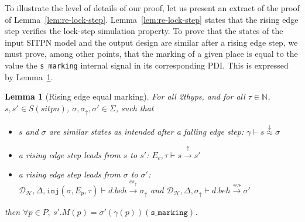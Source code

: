 \documentclass[pdflatex,sn-mathphys]{sn-jnl}%
\theoremstyle{thmstyleone}%
\theoremstyle{thmstyletwo}%
\theoremstyle{thmstylethree}%
\newtheorem{lemma}{Lemma}%
\begin{document}
To illustrate the level of details of our proof, let us present an
extract of the proof of
Lemma~\ref{lem:re-lock-step}. Lemma~\ref{lem:re-lock-step} states that
the rising edge step verifies the lock-step simulation property. To
prove that the states of the input SITPN model and the output design
are similar after a rising edge step, we must prove, among other
points, that the marking of a given place is equal to the value the
\texttt{s\_marking} internal signal in its corresponding PDI. This is
expressed by Lemma~\ref{lem:re-eq-marking}.

\begin{lemma}[Rising edge equal marking]
  \label{lem:re-eq-marking}
  For all \hm2thyps{}, and for all $\tau\in\mathbb{N}$,
  $s,s'\in{}S(sitpn)$, $\sigma,\sigma_\uparrow,\sigma'\in\Sigma$, such
  that
  \begin{itemize}
  \item $s$ and $\sigma$ are similar states as intended after a
    falling edge step:
    $\gamma\vdash{}s\stackrel{\downarrow}{\approx}\sigma$
  \item a rising edge step leads from $s$ to $s'$:
    $E_c,\tau\vdash{}s\xrightarrow{\uparrow}s'$
  \item a rising edge step leads from $\sigma$ to $\sigma'$:\\
    $\mathcal{D}_\mathcal{H},\Delta,\mathtt{inj}(\sigma,E_p,\tau)\vdash{}d.beh\xrightarrow{cs_{\uparrow}}\sigma_{\uparrow}$
    and
    $\mathcal{D}_\mathcal{H},\Delta,\sigma_{\uparrow}\vdash{}d.beh\xrightarrow{\rightsquigarrow}\sigma'$
  \end{itemize}
  then
  $\forall{}p\in{}P,~s'.M(p)=\sigma'(\gamma(p))(\mathtt{s\_marking})$.
  
\end{lemma}
\end{document}
